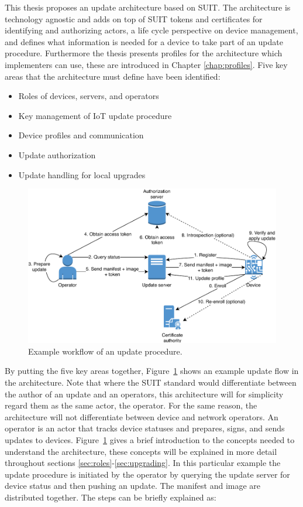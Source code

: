 \documentclass[0-thesis.tex]{subfiles}
\begin{document}
This thesis proposes an update architecture based on SUIT. The architecture is technology
agnostic and adds on top of SUIT tokens and certificates for identifying and authorizing
actors, a life cycle perspective on device management, and defines what information is
needed for a device to take part of an update procedure. Furthermore the thesis presents
profiles for the architecture which implementers can use, these are introduced in Chapter
\ref{chap:profiles}. Five key areas that the architecture must define have been
identified:

\begin{itemize}
    \item Roles of devices, servers, and operators
    \item Key management of IoT update procedure
    \item Device profiles and communication
    \item Update authorization
    \item Update handling for local upgrades
\end{itemize}

\begin{figure}
    \caption{Example workflow of an update procedure.}
    \label{fig:communication-workflow}
    \includegraphics{images/update-flow.pdf}
\end{figure}

By putting the five key areas together, Figure~\ref{fig:communication-workflow} shows an
example update flow in the architecture. Note that where the SUIT standard would
differentiate between the author of an update and an operators, this architecture will for
simplicity regard them as the same actor, the operator. For the same reason, the
architecture will not differentiate between device and network operators. An operator is
an actor that tracks device statuses and prepares, signs, and sends updates to devices.
Figure~\ref{fig:communication-workflow} gives a brief introduction to the concepts needed
to understand the architecture, these concepts will be explained in more detail throughout
sections \ref{sec:roles}-\ref{sec:upgrading}. In this particular example the update
procedure is initiated by the operator by querying the update server for device status and
then pushing an update. The manifest and image are distributed together. The steps can be
briefly explained as:
\end{document}
